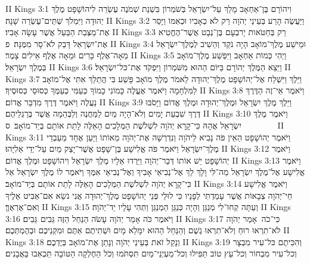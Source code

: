 II Kings 3:1	וִיהוֹרָם בֶּן־אַחְאָב מָלַךְ עַל־יִשְׂרָאֵל בְּשֹׁמְרוֹן בִּשְׁנַת שְׁמֹנֶה עֶשְׂרֵה לִיהוֹשָׁפָט מֶלֶךְ יְהוּדָה וַיִּמְלֹךְ שְׁתֵּים־עֶשְׂרֵה שָׁנָה׃
II Kings 3:2	וַיַּעֲשֶׂה הָרַע בְּעֵינֵי יְהֹוָה רַק לֹא כְאָבִיו וּכְאִמּוֹ וַיָּסַר אֶת־מַצְּבַת הַבַּעַל אֲשֶׁר עָשָׂה אָבִיו׃
II Kings 3:3	רַק בְּחַטֹּאות יָרבְעָם בֶּן־נְבָט אֲשֶׁר־הֶחֱטִיא אֶת־יִשְׂרָאֵל דָּבֵק לֹא־סָר מִמֶּנָּה׃ {פ}
II Kings 3:4	וּמֵישַׁע מֶלֶךְ־מוֹאָב הָיָה נֹקֵד וְהֵשִׁיב לְמֶלֶךְ־יִשְׂרָאֵל מֵאָה־אֶלֶף כָּרִים וּמֵאָה אֶלֶף אֵילִים צָמֶר׃
II Kings 3:5	וַיְהִי כְּמוֹת אַחְאָב וַיִּפְשַׁע מֶלֶךְ־מוֹאָב בְּמֶלֶךְ יִשְׂרָאֵל׃
II Kings 3:6	וַיֵּצֵא הַמֶּלֶךְ יְהוֹרָם בַּיּוֹם הַהוּא מִשֹּׁמְרוֹן וַיִּפְקֹד אֶת־כּל־יִשְׂרָאֵל׃
II Kings 3:7	וַיֵּלֶךְ וַיִּשְׁלַח אֶל־יְהוֹשָׁפָט מֶלֶךְ־יְהוּדָה לֵאמֹר מֶלֶךְ מוֹאָב פָּשַׁע בִּי הֲתֵלֵךְ אִתִּי אֶל־מוֹאָב לַמִּלְחָמָה וַיֹּאמֶר אֶעֱלֶה כָּמוֹנִי כָמוֹךָ כְּעַמִּי כְעַמֶּךָ כְּסוּסַי כְּסוּסֶיךָ׃
II Kings 3:8	וַיֹּאמֶר אֵי־זֶה הַדֶּרֶךְ נַעֲלֶה וַיֹּאמֶר דֶּרֶךְ מִדְבַּר אֱדוֹם׃
II Kings 3:9	וַיֵּלֶךְ מֶלֶךְ יִשְׂרָאֵל וּמֶלֶךְ־יְהוּדָה וּמֶלֶךְ אֱדוֹם וַיָּסֹבּוּ דֶּרֶךְ שִׁבְעַת יָמִים וְלֹא־הָיָה מַיִם לַמַּחֲנֶה וְלַבְּהֵמָה אֲשֶׁר בְּרַגְלֵיהֶם׃
II Kings 3:10	וַיֹּאמֶר מֶלֶךְ יִשְׂרָאֵל אֲהָהּ כִּי־קָרָא יְהֹוָה לִשְׁלֹשֶׁת הַמְּלָכִים הָאֵלֶּה לָתֵת אוֹתָם בְּיַד־מוֹאָב׃ {ס}        
II Kings 3:11	וַיֹּאמֶר יְהוֹשָׁפָט הַאֵין פֹּה נָבִיא לַיהֹוָה וְנִדְרְשָׁה אֶת־יְהֹוָה מֵאוֹתוֹ וַיַּעַן אֶחָד מֵעַבְדֵי מֶלֶךְ־יִשְׂרָאֵל וַיֹּאמֶר פֹּה אֱלִישָׁע בֶּן־שָׁפָט אֲשֶׁר־יָצַק מַיִם עַל־יְדֵי אֵלִיָּהוּ׃
II Kings 3:12	וַיֹּאמֶר יְהוֹשָׁפָט יֵשׁ אוֹתוֹ דְּבַר־יְהֹוָה וַיֵּרְדוּ אֵלָיו מֶלֶךְ יִשְׂרָאֵל וִיהוֹשָׁפָט וּמֶלֶךְ אֱדוֹם׃
II Kings 3:13	וַיֹּאמֶר אֱלִישָׁע אֶל־מֶלֶךְ יִשְׂרָאֵל מַה־לִּי וָלָךְ לֵךְ אֶל־נְבִיאֵי אָבִיךָ וְאֶל־נְבִיאֵי אִמֶּךָ וַיֹּאמֶר לוֹ מֶלֶךְ יִשְׂרָאֵל אַל כִּי־קָרָא יְהֹוָה לִשְׁלֹשֶׁת הַמְּלָכִים הָאֵלֶּה לָתֵת אוֹתָם בְּיַד־מוֹאָב׃
II Kings 3:14	וַיֹּאמֶר אֱלִישָׁע חַי־יְהֹוָה צְבָאוֹת אֲשֶׁר עָמַדְתִּי לְפָנָיו כִּי לוּלֵי פְּנֵי יְהוֹשָׁפָט מֶלֶךְ־יְהוּדָה אֲנִי נֹשֵׂא אִם־אַבִּיט אֵלֶיךָ וְאִם־אֶרְאֶךָּ׃
II Kings 3:15	וְעַתָּה קְחוּ־לִי מְנַגֵּן וְהָיָה כְּנַגֵּן הַמְנַגֵּן וַתְּהִי עָלָיו יַד־יְהֹוָה׃
II Kings 3:16	וַיֹּאמֶר כֹּה אָמַר יְהֹוָה עָשֹׂה הַנַּחַל הַזֶּה גֵּבִים  גֵּבִים׃
II Kings 3:17	כִּי־כֹה  אָמַר יְהֹוָה לֹא־תִרְאוּ רוּחַ וְלֹא־תִרְאוּ גֶשֶׁם וְהַנַּחַל הַהוּא יִמָּלֵא מָיִם וּשְׁתִיתֶם אַתֶּם וּמִקְנֵיכֶם וּבְהֶמְתְּכֶם׃
II Kings 3:18	וְנָקַל זֹאת בְּעֵינֵי יְהֹוָה וְנָתַן אֶת־מוֹאָב בְּיֶדְכֶם׃
II Kings 3:19	וְהִכִּיתֶם כּל־עִיר מִבְצָר וְכל־עִיר מִבְחוֹר וְכל־עֵץ טוֹב תַּפִּילוּ וְכל־מַעְיְנֵי־מַיִם תִּסְתֹּמוּ וְכֹל הַחֶלְקָה הַטּוֹבָה תַּכְאִבוּ בָּאֲבָנִים׃
